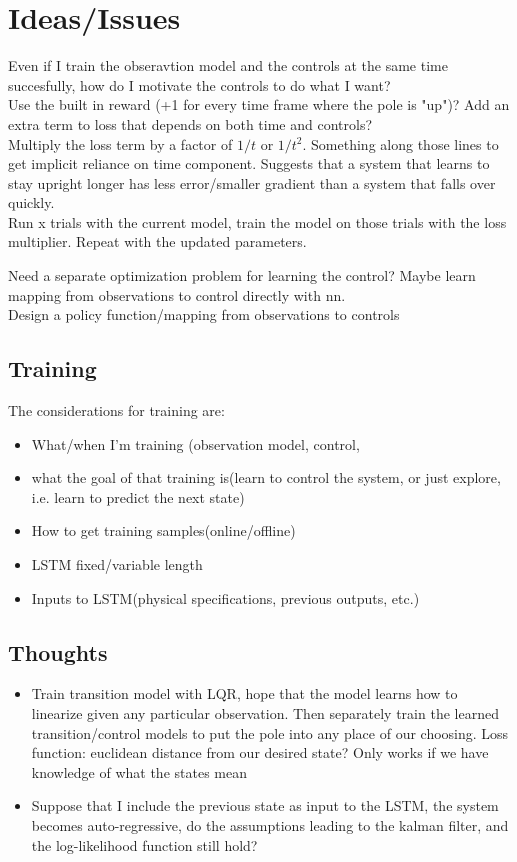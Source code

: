 \documentclass[twoside]{article}
\begin{document}
\section{Ideas/Issues}
Even if I train the obseravtion model and the controls at the same time succesfully, how do I motivate the controls to do what I want?\\

Use the built in reward (+1 for every time frame where the pole is "up")? Add an extra term to loss that depends on both time and controls?\\

Multiply the loss term by a factor of $1/t$ or $1/t^{2}$. Something along those lines to get implicit reliance on time component. Suggests that a system that learns to stay upright longer has less error/smaller gradient than a system that falls over quickly.\\

Run x trials with the current model, train the model on those trials with the loss multiplier. Repeat with the updated parameters.

Need a separate optimization problem for learning the control? Maybe learn mapping from observations to control directly with nn.\\
Design a policy function/mapping from observations to controls

\subsection{Training}
The considerations for training are:
\begin{itemize}
\item What/when I'm training (observation model, control, 
\item what the goal of that training is(learn to control the system, or just explore, i.e. learn to predict the next state)
\item How to get training samples(online/offline)
\item LSTM fixed/variable length
\item Inputs to LSTM(physical specifications, previous outputs, etc.)
\end{itemize}
\subsection{Thoughts}
\begin{itemize}
\item Train transition model with LQR, hope that the model learns how to linearize given any particular observation. Then separately train the learned transition/control models to put the pole into any place of our choosing. 
Loss function: euclidean distance from our desired state? Only works if we have knowledge of what the states mean
\item Suppose that I include the previous state as input to the LSTM, the system becomes auto-regressive, do the assumptions leading to the kalman filter, and the log-likelihood function still hold?
\end{itemize}
\end{document}
